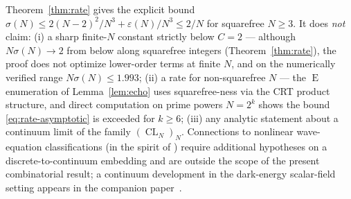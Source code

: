 \documentclass[11pt,reqno]{amsart}
\theoremstyle{plain}
\theoremstyle{definition}
\theoremstyle{remark}
\DeclareMathOperator{\CL}{CL}
\DeclareMathOperator{\ECHO}{E}
\begin{document}
Theorem~\ref{thm:rate} gives the explicit bound
$\sigma(N)\le 2(N-2)^{2}/N^{3}+\varepsilon(N)/N^{3}\le 2/N$ for
squarefree $N\ge 3$. It does \emph{not} claim:
(i) a sharp finite-$N$ constant strictly below $C=2$ --- although
$N\sigma(N)\to 2$ from below along squarefree integers
(Theorem~\ref{thm:rate}), the proof does not optimize lower-order
terms at finite $N$, and on the numerically verified range
$N\sigma(N)\le 1.993$;
(ii) a rate for non-squarefree $N$ --- the $\ECHO$ enumeration of
Lemma~\ref{lem:echo} uses squarefree-ness via the CRT product
structure, and direct computation on prime powers $N=2^{k}$ shows
the bound \eqref{eq:rate-asymptotic} is exceeded for $k\ge 6$;
(iii) any analytic statement about a continuum limit of the family
$(\CL_N)_{N}$. Connections to nonlinear wave-equation classifications
(in the spirit of \cite{BB1976}) require additional hypotheses on a
discrete-to-continuum embedding and are outside the scope of the
present combinatorial result; a continuum development in the
dark-energy scalar-field setting appears in the companion
paper~\cite{SandersGish2026JCAP}.
\end{document}

